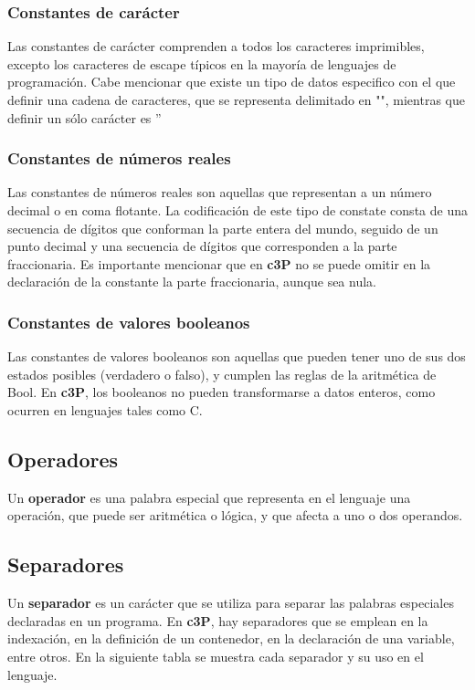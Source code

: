 \subsubsection{Constantes de carácter}

Las constantes de carácter comprenden a todos los caracteres imprimibles, excepto los
caracteres de escape típicos en la mayoría de lenguajes de programación. Cabe mencionar
que existe un tipo de datos especifico con el que definir una cadena de caracteres,
que se representa delimitado en "", mientras que definir un sólo carácter es  ''

\subsubsection{Constantes de números reales}

Las constantes de números reales son aquellas que representan a un número decimal o
en coma flotante. La codificación de este tipo de constate consta de una secuencia
de dígitos que conforman la parte entera del mundo, seguido de un punto decimal y
una secuencia de dígitos que corresponden a la parte fraccionaria. Es importante
mencionar que en \textbf{c3P} no se puede omitir en la declaración de la constante
la parte fraccionaria, aunque sea nula.

\subsubsection{Constantes de valores booleanos}

Las constantes de valores booleanos son aquellas que pueden tener uno de sus
dos estados posibles (verdadero o falso), y cumplen las reglas de la aritmética
de Bool. En \textbf{c3P}, los booleanos no pueden transformarse a datos enteros,
como ocurren en lenguajes tales como C.

\subsection{Operadores}

Un \textbf{operador} es una palabra especial que representa en el lenguaje una operación,
que puede ser aritmética o lógica, y que afecta a uno o dos operandos.

\subsection{Separadores}

Un \textbf{separador} es un carácter que se utiliza para separar las palabras especiales
declaradas en un programa. En \textbf{c3P}, hay separadores que se emplean en la indexación,
en la definición de un contenedor, en la declaración de una variable, entre otros. En la
siguiente tabla se muestra cada separador y su uso en el lenguaje.

